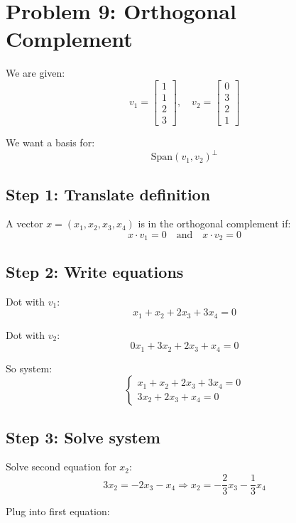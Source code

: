\documentclass[11pt]{article}
\begin{document}
\hrulefill

\section*{Problem 9: Orthogonal Complement}

We are given:
\[
v_1 =
\begin{bmatrix}
1\\1\\2\\3
\end{bmatrix},
\quad
v_2 =
\begin{bmatrix}
0\\3\\2\\1
\end{bmatrix}
\]

We want a basis for:
\[
\text{Span}(v_1, v_2)^\perp
\]

\hrulefill

\subsection*{Step 1: Translate definition}

A vector $x = (x_1,x_2,x_3,x_4)$ is in the orthogonal complement if:
\[
x \cdot v_1 = 0 \quad \text{and} \quad x \cdot v_2 = 0
\]

\hrulefill

\subsection*{Step 2: Write equations}

Dot with $v_1$:
\[
x_1 + x_2 + 2x_3 + 3x_4 = 0
\]

Dot with $v_2$:
\[
0x_1 + 3x_2 + 2x_3 + x_4 = 0
\]

So system:
\[
\begin{cases}
x_1 + x_2 + 2x_3 + 3x_4 = 0 \\
3x_2 + 2x_3 + x_4 = 0
\end{cases}
\]

\hrulefill

\subsection*{Step 3: Solve system}

Solve second equation for $x_2$:
\[
3x_2 = -2x_3 - x_4
\Rightarrow
x_2 = -\frac{2}{3}x_3 - \frac{1}{3}x_4
\]

Plug into first equation:
\end{document}
